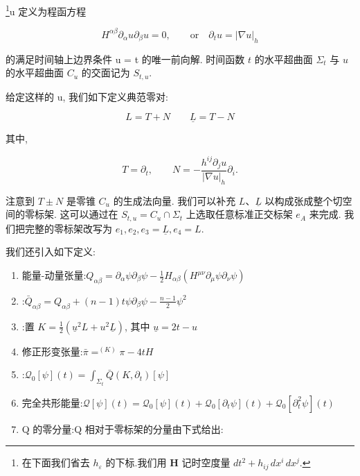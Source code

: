 \begin{definition}\label{def:cG-3.14}
\footnote{在下面我们省去 $h_\varepsilon$ 的下标.我们用 $\mathbf{H}$ 记时空度量 $dt^2+h_{ij}\, dx^i\, dx^j$.}u 定义为程函方程

\begin{equation}
H ^ {\alpha \beta} \partial_ {\alpha} u \partial_ {\beta} u = 0,  \qquad \mathrm{or} \quad \partial_ {t} u = | \nabla u | _ {h}\label{eq:cG-79}
\end{equation}

的满足时间轴上边界条件 u = t 的唯一前向解. 时间函数 $t$ 的水平超曲面 $\Sigma_{t}$ 与 $u$ 的水平超曲面 $C_{u}$ 的交面记为 $S_{t, u}$. 
\end{definition}

\begin{definition}\label{def:cG-3.15}
给定这样的 u, 我们如下定义典范零对:

\begin{equation}
L = T + N \qquad \underline {L} = T - N\label{eq:cG-80}
\end{equation}

其中, 

\[
T = \partial_ {t},  \qquad N = - \frac {h ^ {i j} \partial_ {j} u}{| \nabla u | _ {h}} \partial_ {i}.
\]

注意到 $T \pm N$ 是零锥 $C_{u}$ 的生成法向量. 我们可以补充 $L$、$\underline{L}$ 以构成张成整个切空间的零标架. 这可以通过在 $S_{t, u} = C_{u} \cap \Sigma_{t}$ 上选取任意标准正交标架 $e_{A}$ 来完成. 我们把完整的零标架改写为 $e_{1},  e_{2},  e_{3} = \underline{L},  e_{4} = L$. 
\end{definition}

我们还引入如下定义:

\begin{enumerate}
\def\labelenumi{\roman{enumi})}
\item 能量-动量张量:$Q_{\alpha\beta} = \partial_{\alpha}\psi\partial_{\beta}\psi - \frac{1}{2}H_{\alpha\beta}(H^{\mu\nu}\partial_{\mu}\psi\partial_{\nu}\psi)$
\item {}:$\bar{Q}_{\alpha \beta} = Q_{\alpha \beta} + (n - 1)t\psi \partial_{\beta}\psi - \frac{n - 1}{2}\psi^{2}$
\item {}:置 $K = \frac{1}{2} (\underline{u}^2 L + u^2 \underline{L})$, 其中 $\underline{u} = 2t - u$
\item 修正形变张量:$\bar{\pi} = ^{(K)}\pi - 4tH$
\item {}:$\mathcal{Q}_0[\psi](t) = \int_{\Sigma_t}\bar{Q} (K, \partial_t)[\psi ]$
\item 完全共形能量:$\mathcal{Q}[\psi](t) = \mathcal{Q}_0[\psi](t) + \mathcal{Q}_0[\partial_t\psi](t) + \mathcal{Q}_0[\partial_t^2\psi](t)$
\item Q 的零分量:Q 相对于零标架的分量由下式给出:
\end{enumerate}

